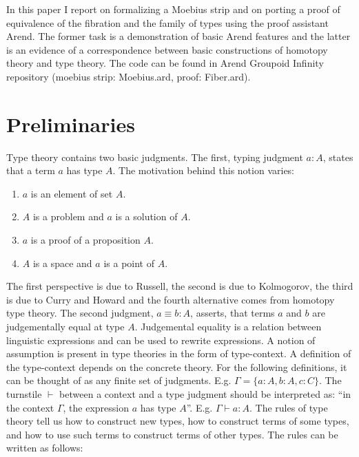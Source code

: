 In this paper I report on formalizing a Moebius strip and on porting a proof of equivalence of the fibration and the family of types using the proof assistant Arend. The former task is a demonstration of basic Arend features and the latter is an evidence of a correspondence between basic constructions of homotopy theory and type theory. The code can be found in Arend Groupoid Infinity repository (moebius strip: Moebius.ard\autocite{Moebius}, proof: Fiber.ard\autocite{Fiber}).

\section{Preliminaries}

Type theory contains two basic judgments. The first, typing judgment $a : A$, states that a term $a$ has type $A$. The motivation behind this notion varies:
\begin{enumerate}
	\item $a$ is an element of set $A$.
	\item $A$ is a problem and $a$ is a solution of $A$.
	\item $a$ is a proof of a proposition $A$.
	\item $A$ is a space and $a$ is a point of $A$.
\end{enumerate}
The first perspective is due to Russell, the second is due to Kolmogorov, the third is due to Curry and Howard and the fourth alternative comes from homotopy type theory\autocite{Warren1}. 
The second judgment, $a \equiv b : A$, asserts, that terms $a$ and $b$ are judgementally equal at type $A$. Judgemental equality is a relation between linguistic expressions and can be used to rewrite expressions\autocite{hottbook}. A notion of assumption is present in type theories in the form of type-context.
A definition of the type-context depends on the concrete theory. For the following definitions, it can be thought of as any finite set of judgments. E.g. $\Gamma = \{a : A, b : A, c : C\}$. The turnstile $\vdash$ between a context and a type judgment should be interpreted as: ``in the context $\Gamma$, the expression $a$ has type $A$''. E.g. $\Gamma \vdash a : A$. The rules of type theory tell us how to construct new types, how to construct terms of some types, and how to use such terms to construct terms of other types. The rules can be written as follows:
\begin{prooftree}
\end{prooftree}
